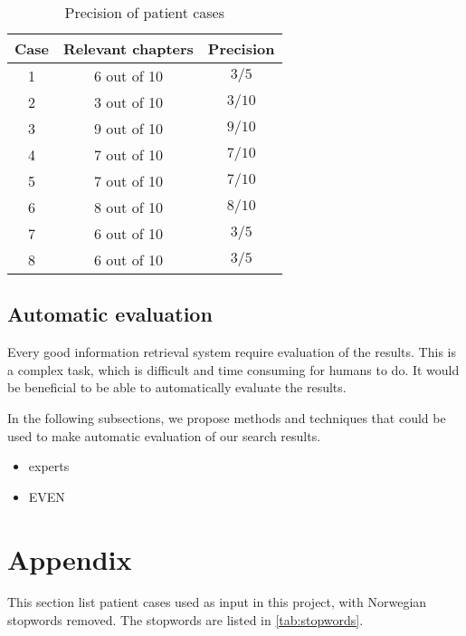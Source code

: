 \documentclass[a4paper, 11pt]{article}
\begin{document}
\begin{table}[htbp] \footnotesize \center
\caption{Precision of patient cases\label{tab:precision}}
\begin{tabular}{c c c}
    \toprule
    Case & Relevant chapters & Precision \\
    \midrule
	1 & 6 out of 10 & \( 3/5 \) \\
	2 & 3 out of 10 & \( 3/10 \) \\
	3 & 9 out of 10 & \( 9/10 \) \\
	4 & 7 out of 10 & \( 7/10 \) \\
	5 & 7 out of 10 & \( 7/10 \) \\
	6 & 8 out of 10 & \( 8/10 \) \\
	7 & 6 out of 10 & \( 3/5 \) \\
	8 & 6 out of 10 & \( 3/5 \) \\
	\bottomrule
\end{tabular}
\end{table}

\subsection{Automatic evaluation}
Every good information retrieval system require evaluation of the results. This is a complex task, which is difficult and time consuming for humans to do. It would be beneficial to be able to automatically evaluate the results.

In the following subsections, we propose methods and techniques that could be used to make automatic evaluation of our search results.

\begin{itemize}
\item experts
\item EVEN
\end{itemize}


\appendix
\section{Appendix}
\label{appendix}
This section list patient cases used as input in this project, with Norwegian
stopwords removed. The stopwords are listed in \autoref{tab:stopwords}.


\end{document}

